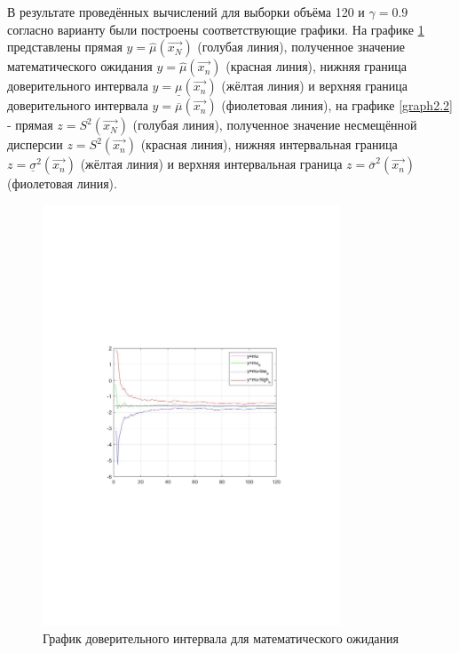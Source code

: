 \documentclass[12pt,a4paper]{scrartcl}
\begin{document}
В результате проведённых вычислений для выборки объёма 120 и $γ = 0.9$ согласно варианту были построены соответствующие графики. На графике \ref{graph2.1} представлены прямая $y = \hat{μ}(\overrightarrow {x_N})$ (голубая линия), полученное значение математического ожидания $y = \hat{μ}(\overrightarrow {x_n})$ (красная линия), нижняя граница доверительного интервала $y = \underline {μ}(\overrightarrow {x_n})$ (жёлтая линия) и верхняя граница доверительного интервала $y = \overline {μ}(\overrightarrow {x_n})$ (фиолетовая линия), на графике \ref{graph2.2} - прямая $z = S^2(\overrightarrow {x_N})$ (голубая линия), полученное значение несмещённой дисперсии $z = S^2(\overrightarrow {x_n})$ (красная линия), нижняя интервальная граница $z = \underline {σ}^2 (\overrightarrow {x_n})$ (жёлтая линия) и верхняя интервальная граница $z = \overline {σ}^2 (\overrightarrow {x_n})$ (фиолетовая линия).
\begin{figure}[H]
	\centering
	\includegraphics[width=335px]{2.pdf}
	\caption{График доверительного интервала для математического ожидания}
	\label{graph2.1}
\end{figure}
\end{document}
